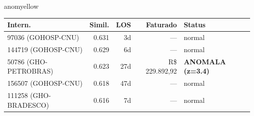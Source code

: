 \documentclass[a4paper,10pt]{article}
\begin{document}
\begin{anomalycard}[Internacao 3737 | GHO-AMIL | MODERADO (z=2.45)]{anomyellow}
\begin{tabular}{l r r r l}\toprule\textbf{Intern.} & \textbf{Simil.} & \textbf{LOS} & \textbf{Faturado} & \textbf{Status} \\\midrule
97036 (GOHOSP-CNU) & 0.631 & 3d & --- & \textcolor{jcubeblue}{normal} \\
144719 (GOHOSP-CNU) & 0.629 & 6d & --- & \textcolor{jcubeblue}{normal} \\
50786 (GHO-PETROBRAS) & 0.623 & 27d & R\$ 229.892,92 & \textcolor{anomred}{\textbf{ANOMALA (z=3.4)}} \\
156507 (GOHOSP-CNU) & 0.618 & 47d & --- & \textcolor{jcubeblue}{normal} \\
111258 (GHO-BRADESCO) & 0.616 & 7d & --- & \textcolor{jcubeblue}{normal} \\
\bottomrule\end{tabular}


\end{anomalycard}

\newpage
\end{document}
